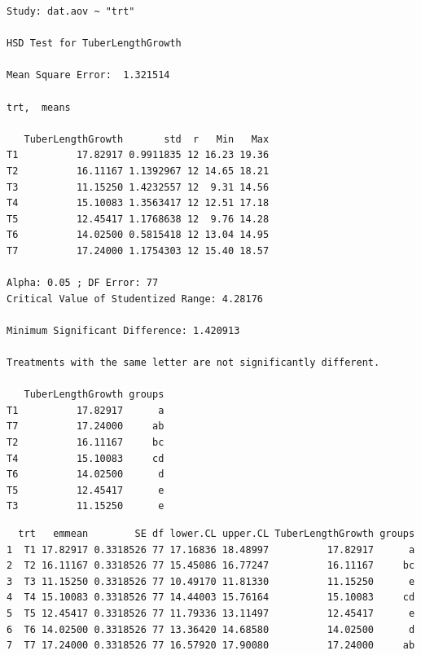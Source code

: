 \documentclass[a4paper, 10pt, fleqn, twosided]{memoir}
\begin{document}
\begin{tcolorbox}[title = Example 2 Tukey's multiple comparison output]
\begin{verbatim}
Study: dat.aov ~ "trt"

HSD Test for TuberLengthGrowth

Mean Square Error:  1.321514

trt,  means

   TuberLengthGrowth       std  r   Min   Max
T1          17.82917 0.9911835 12 16.23 19.36
T2          16.11167 1.1392967 12 14.65 18.21
T3          11.15250 1.4232557 12  9.31 14.56
T4          15.10083 1.3563417 12 12.51 17.18
T5          12.45417 1.1768638 12  9.76 14.28
T6          14.02500 0.5815418 12 13.04 14.95
T7          17.24000 1.1754303 12 15.40 18.57

Alpha: 0.05 ; DF Error: 77
Critical Value of Studentized Range: 4.28176

Minimum Significant Difference: 1.420913

Treatments with the same letter are not significantly different.

   TuberLengthGrowth groups
T1          17.82917      a
T7          17.24000     ab
T2          16.11167     bc
T4          15.10083     cd
T6          14.02500      d
T5          12.45417      e
T3          11.15250      e
\end{verbatim}
\tcblower
\begin{verbatim}
  trt   emmean        SE df lower.CL upper.CL TuberLengthGrowth groups
1  T1 17.82917 0.3318526 77 17.16836 18.48997          17.82917      a
2  T2 16.11167 0.3318526 77 15.45086 16.77247          16.11167     bc
3  T3 11.15250 0.3318526 77 10.49170 11.81330          11.15250      e
4  T4 15.10083 0.3318526 77 14.44003 15.76164          15.10083     cd
5  T5 12.45417 0.3318526 77 11.79336 13.11497          12.45417      e
6  T6 14.02500 0.3318526 77 13.36420 14.68580          14.02500      d
7  T7 17.24000 0.3318526 77 16.57920 17.90080          17.24000     ab

\end{verbatim}
\end{tcolorbox}
\end{document}
